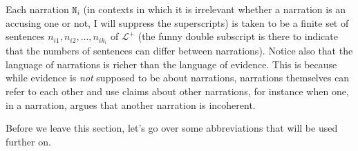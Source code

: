 \documentclass[10pt,leqno]{article}
\begin{document}
Each narration $\mathtt{N}_i$ (in contexts in which it is irrelevant whether a narration is  an accusing one or not, I will suppress the superscripts) is taken to be  a finite set of sentences $n_{i1}, n_{i2}, \dots, n_{ik_{i}}$ of $\mathcal{L}^+$ (the funny double subscript is there to indicate that the numbers of sentences can differ between narrations). Notice also that the language of narrations is richer than the language of evidence. This is because while evidence is \emph{not} supposed to be about narrations, narrations themselves can refer to each other and use claims about other narrations, for instance when one, in a narration, argues that another narration is incoherent.

Before we leave this section, let's go over some abbreviations that will be used further on. 
\end{document}

